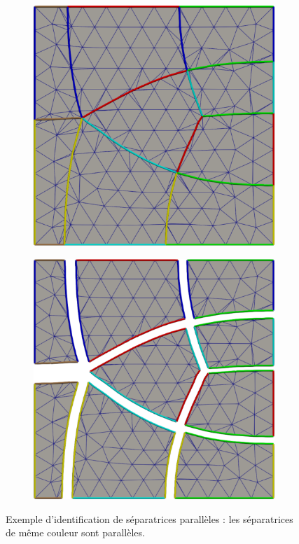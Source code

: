 \begin{figure}[h!]
\centering
\begin{subfigure}{0.49\textwidth}
    \includegraphics[width=\textwidth]{images/separatrice_echantillonage_1.pdf}
\end{subfigure}
\hfill
\begin{subfigure}{0.49\textwidth}
    \includegraphics[width=\textwidth]{images/separatrice_echantillonage_2.pdf}
\end{subfigure}
\caption{Exemple d'identification de séparatrices parallèles : les séparatrices de même couleur sont parallèles.}
\label{fig:separatrice_echantillonage}
\end{figure}

